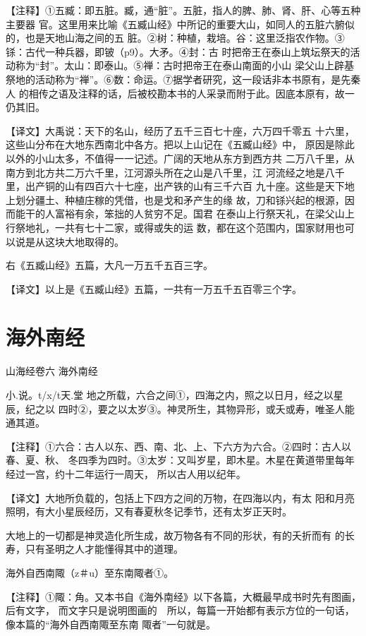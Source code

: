 \documentclass[a4paper,12pt,UTF8,twoside]{ctexbook}
\begin{document}
【注释】①五臧：即五脏。臧，通“脏”。五脏，指人的脾、肺、肾、肝、心等五种主要器 官。这里用来比喻《五臧山经》中所记的重要大山，如同人的五脏六腑似的，也是天地山海之间的五 脏。②树：种植，栽培。谷：这里泛指农作物。③铩：古代一种兵器，即铍（p9）。大矛。④封：古 时把帝王在泰山上筑坛祭天的活动称为“封”。太山：即泰山。⑤禅：古时把帝王在泰山南面的小山 梁父山上辟基祭地的活动称为“禅”。⑥数：命运。⑦据学者研究，这一段话非本书原有，是先秦人 的相传之语及注释的话，后被校勘本书的人采录而附于此。因底本原有，故一仍其旧。

【译文】大禹说：天下的名山，经历了五千三百七十座，六万四千零五 十六里，这些山分布在大地东西南北中各方。把以上山记在《五臧山经》中， 原因是除此以外的小山太多，不值得一一记述。广阔的天地从东方到西方共 二万八千里，从南方到北方共二万六千里，江河源头所在之山是八千里，江 河流经之地是八千里，出产铜的山有四百六十七座，出产铁的山有三千六百 九十座。这些是天下地上划分疆土、种植庄稼的凭借，也是戈和矛产生的缘 故，刀和铩兴起的根源，因而能干的人富裕有余，笨拙的人贫穷不足。国君 在泰山上行祭天礼，在梁父山上行祭地礼，一共有七十二家，或得或失的运 数，都在这个范围内，国家财用也可以说是从这块大地取得的。

右《五臧山经》五篇，大凡一万五千五百三字。

【译文】以上是《五臧山经》五篇，一共有一万五千五百零三个字。


\chapter{海外南经}

山海经卷六 海外南经

小.说。t/x/t天.堂
地之所载，六合之间①，四海之内，照之以日月，经之以星辰，纪之以 四时②，要之以太岁③。神灵所生，其物异形，或夭或寿，唯圣人能通其道。

【注释】①六合：古人以东、西、南、北、上、下六方为六合。②四时：古人以春、夏、秋、 冬四季为四时。③太岁：又叫岁星，即木星。木星在黄道带里每年经过一宫，约十二年运行一周天， 所以古人用以纪年。

【译文】大地所负载的，包括上下四方之间的万物，在四海以内，有太 阳和月亮照明，有大小星辰经历，又有春夏秋冬记季节，还有太岁正天时。

大地上的一切都是神灵造化所生成，故万物各有不同的形状，有的夭折而有 的长寿，只有圣明之人才能懂得其中的道理。

海外自西南陬（z＃u）至东南陬者①。

【注释】①陬：角。又本书自《海外南经》以下各篇，大概最早成书时先有图画，后有文字， 而文字只是说明图画的　所以，每篇一开始都有表示方位的一句话，像本篇的“海外自西南陬至东南 陬者”一句就是。
\end{document}
